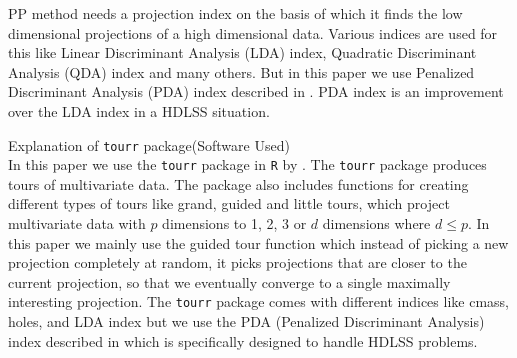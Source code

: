 \documentclass[12]{article}
\begin{document}
PP method needs a projection index on the basis of which it finds the low dimensional projections of a high dimensional data. Various indices are used for this like Linear Discriminant Analysis (LDA) index, Quadratic Discriminant Analysis (QDA) index and many others. But in this paper we use Penalized Discriminant Analysis (PDA) index described in \cite{lee:2009}. PDA index is an improvement over the LDA index in a HDLSS situation. 

{\color{red} Explanation of \texttt{tourr} package(Software Used)} \\
In this paper we use the \texttt{tourr} package in \texttt{R} \cite{r} by \cite{WC08}. The \texttt{tourr} package produces tours of multivariate data. The package also includes functions for creating different types of tours like grand, guided and little tours, which project multivariate data with $p$ dimensions to 1, 2, 3 or $d$ dimensions where $d \le p$. In this paper we mainly use the guided tour function which instead of picking a new projection completely at random, it picks projections that are closer to the current projection, so that we eventually converge to a single maximally interesting projection. The \texttt{tourr} package comes with different indices like cmass, holes, and LDA index but we use the PDA (Penalized Discriminant Analysis)  index described in \cite{lee:2009} which is specifically designed to handle HDLSS problems. \\     


%
%
\end{document}
